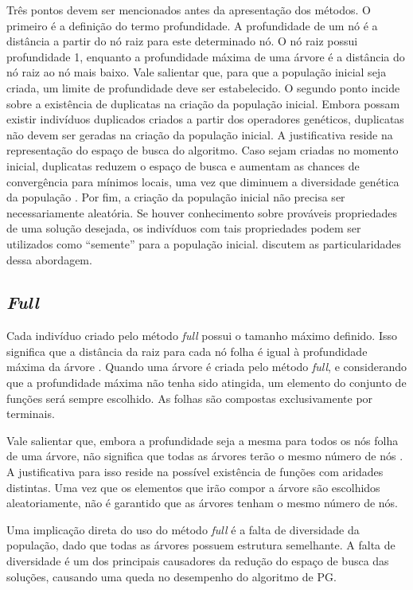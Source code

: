 Três pontos devem ser mencionados antes da apresentação dos métodos. O primeiro é a definição do termo profundidade. A profundidade de um nó é a distância a partir do nó raiz para este determinado nó. O nó raiz possui profundidade 1, enquanto a profundidade máxima de uma árvore é a distância do nó raiz ao nó mais baixo. Vale salientar que, para que a população inicial seja criada, um limite de profundidade deve ser estabelecido. O segundo ponto incide sobre a existência de duplicatas na criação da população inicial. Embora possam existir indivíduos duplicados criados a partir dos operadores genéticos, duplicatas não devem ser geradas na criação da população inicial. A justificativa reside na representação do espaço de busca do algoritmo. Caso sejam criadas no momento inicial, duplicatas reduzem o espaço de busca e aumentam as chances de convergência para mínimos locais, uma vez que diminuem a diversidade genética da população \cite{koza1992}. %
Por fim, a criação da população inicial não precisa ser necessariamente aleatória. Se houver conhecimento sobre prováveis propriedades de uma solução desejada, os indivíduos com tais propriedades podem ser utilizados como ``semente'' para a população inicial.  discutem as particularidades dessa abordagem.

\subsection{\textit{Full}}
Cada indivíduo criado pelo método \textit{full} possui o tamanho máximo definido. Isso significa que a distância da raiz para cada nó folha é igual à profundidade máxima da árvore \cite{koza1992}. Quando uma árvore é criada pelo método \textit{full}, e considerando que a profundidade máxima não tenha sido atingida, um elemento do conjunto de funções será sempre escolhido. As folhas são compostas exclusivamente por terminais.

Vale salientar que, embora a profundidade seja a mesma para todos os nós folha de uma árvore, não significa que todas as árvores terão o mesmo número de nós \cite{poli2008}. A justificativa para isso reside na possível existência de funções com aridades distintas. Uma vez que os elementos que irão compor a árvore são escolhidos aleatoriamente, não é garantido que as árvores tenham o mesmo número de nós.

Uma implicação direta do uso do método \textit{full} é a falta de diversidade da população, dado que todas as árvores possuem estrutura semelhante. A falta de diversidade é um dos principais causadores da redução do espaço de busca das soluções, causando uma queda no desempenho do algoritmo de PG.

